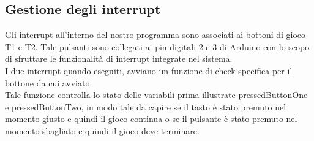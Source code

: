 \documentclass[a4paper]{article}
\begin{document}
\subsection*{Gestione degli interrupt}
Gli interrupt all'interno del nostro programma sono associati ai bottoni di gioco T1 e T2.
Tale pulsanti sono collegati ai pin digitali 2 e 3 di Arduino con lo scopo di sfruttare le funzionalità di interrupt integrate nel sistema.
\\I due interrupt quando eseguiti, avviano un funzione di check specifica per il bottone da cui avviato.
\\Tale funzione controlla lo stato delle variabili prima illustrate pressedButtonOne e pressedButtonTwo, in modo tale da capire se il tasto è stato premuto nel momento giusto e quindi il gioco continua o se il pulsante è stato premuto nel momento sbagliato e quindi il gioco deve terminare.
\end{document}
